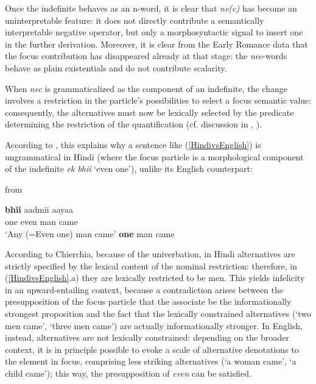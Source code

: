 \documentclass[output=paper,modfonts,nonflat,citecolor=brown,
showindex
]{langsci/langscibook}
\begin{document}
Once the indefinite behaves as an n-word, it is clear that {\emph{ne(c)}} has become an uninterpretable feature: it does not directly contribute a semantically interpretable negative operator, but only a morphosyntactic signal to insert one in the further derivation. Moreover, it is clear from the Early Romance data that the focus contribution has disappeared already at that stage: the {\emph{nec}}-words behave as plain existentials and do not contribute scalarity.

When {\emph{nec}} is grammaticalized as the component of an indefinite, the change involves a restriction in the particle's possibilities to select a focus semantic value: consequently, the alternatives must now be lexically selected by the predicate determining the restriction of the quantification (cf. discussion in \citealt[]{Lahiri98}, \citealt[]{Chierchia13}).

According to \citet[156-157]{Chierchia13}, this explains why a sentence like (\ref{HindivsEnglish}) is ungrammatical in Hindi (where the focus particle is a morphological component of the indefinite {\emph{ek bhii}} `even one'), unlike its English counterpart:

{\begin{exe}
\ex \label{HindivsEnglish} from \citet[156-157]{Chierchia13}
\begin{xlist}
\ex {} {\textbf{bhii}} aadmii aayaa\\ 
one even man came\\
`Any (=Even one) man came'
 {\textbf{one}} man came
\end{xlist}
\end{exe}}

\noindent According to Chierchia, because of the univerbation, in Hindi alternatives are strictly specified by the lexical content of the nominal restriction: therefore, in (\ref{HindivsEnglish}.a) they are lexically restricted to be men. This yields infelicity in an upward-entailing context, because a contradiction arises between the presupposition of the focus particle that the associate be the informationally strongest proposition and the fact that the lexically constrained alternatives (`two men came', `three men came') are actually informationally stronger. In English, instead, alternatives are not lexically constrained: depending on the broader context, it is in principle possible to evoke a scale of alternative denotations to the element in focus, comprising less striking alternatives (`a woman came', `a child came'); this way, the presupposition of {\emph{even}} can be satisfied.
\end{document}
